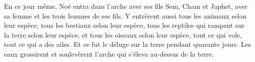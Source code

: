 En ce jour même, Noé entra dans l’arche avec ses fils Sem, Cham et Japhet,
	avec sa femme et les trois femmes de ses fils.
Y entrèrent aussi tous les animaux selon leur espèce,
	tous les bestiaux selon leur espèce,
	tous les reptiles qui rampent sur la terre selon leur espèce,
	et tous les oiseaux selon leur espèce,
		tout ce qui vole, tout ce qui a des ailes.
Et ce fut le déluge sur la terre pendant quarante jours.
Les eaux grossirent et soulevèrent l’arche qui s’éleva au-dessus de la terre.
